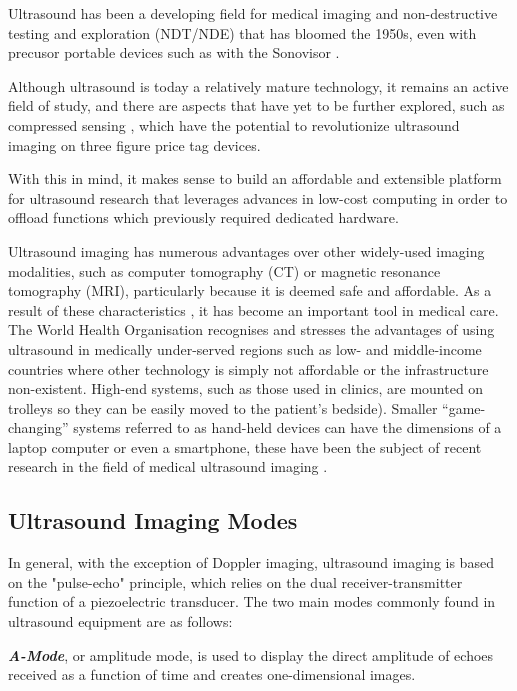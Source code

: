 \documentclass{article}
\begin{document}
Ultrasound has been a developing field for medical imaging and non-destructive testing and exploration (NDT/NDE) that has bloomed the 1950s, even with precusor portable devices such as with the Sonovisor \cite{zeiss_sonovisor_1962}.

Although ultrasound is today a relatively mature technology, it remains an active field of study, and  there are aspects that have yet to be further explored, such as compressed sensing \cite{kruizinga_compressive_2017, liebgott_compressive_2012}, which have the potential to revolutionize ultrasound imaging on three figure price tag devices.

With this in mind, it makes sense to build an affordable and extensible platform for ultrasound research that leverages advances in low-cost computing in order to offload functions which previously required dedicated hardware.

Ultrasound imaging has numerous advantages over other widely-used imaging modalities, such as computer tomography (CT) or magnetic resonance tomography (MRI), particularly because it is deemed safe and affordable. As a result of these characteristics \cite{kurjak_use_1986}, it has become an important tool in medical care. The World Health Organisation \cite{who_future_1985} recognises and stresses the advantages of using ultrasound in medically under-served regions such as low- and middle-income countries where other technology is simply not affordable or the infrastructure non-existent. High-end systems, such as those used in clinics, are mounted on trolleys so they can be easily moved to the patient’s bedside). Smaller  “game-changing” systems referred to as hand-held devices can have the dimensions of a laptop computer or even a smartphone, these have been the subject of recent research in the field of medical ultrasound imaging \cite{kjeken_systematic_2011}.

\subsection{Ultrasound Imaging Modes}

In general, with the exception of Doppler imaging, ultrasound imaging is based on the "pulse-echo" principle, which relies on the dual receiver-transmitter function of a piezoelectric transducer. The two main modes commonly found in ultrasound equipment are as follows:

\textbf{\textit{A-Mode}}, or amplitude mode, is used to display the direct amplitude of echoes received as a function of time and creates one-dimensional images.
\end{document}
